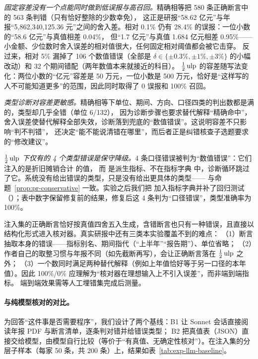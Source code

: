 \emph{固定容差没有一个点能同时做到低误报与高召回。}精确相等把 580 条正确断言中的 563 条判错（只有恰好整除的少数幸免），
这正是研报“58.62 亿元”与年报“5,862,340,125.36 元”之间的舍入差。相对 0.1\% 仍有 28.4\% 的误报：一位小数的“58.6 亿元”与真值相差 0.04\%，
但“1.7 亿元”与真值 1.684 亿元相差 0.95\%——小金额、少位数时舍入误差的相对值很大，任何固定相对阈值都会被它击穿。
反过来，相对 5\% 漏掉了 106 个数值错误（全部是 $\delta\in\{\pm0.3\%,\pm1\%,\pm3\%\}$ 的小幅改动）和 32 个期间错配（两年数值本来就接近的科目）。
$\tfrac12\operatorname{ulp}$ 的容差随写法变化：两位小数的“亿元”容差是 50 万元，一位小数是 500 万元，恰好是“这样写的人不可能知道更多”的范围，因此同时取得了 0 误报和 100\% 召回。

\emph{类型诊断对容差更敏感。}精确相等下单位、期间、方向、口径四类的判出数都是满的，类型却几乎全错（单位 6/132），
因为诊断步骤也要求替代解释“精确命中”，舍入误差使替代解释全部失效，诊断落到兜底的“数值错误”。这说明容差不只影响“判不判错”，
还决定“能不能说清错在哪里”，而后者正是纠错核查子选题要求的“修改建议”。

\emph{$\tfrac12\operatorname{ulp}$ 下仅有的 4 个类型错误是保守降级。}4 条口径错误被判为“数值错误”：它们注入的是折旧摊销合计  的值，
而  是派生指标、不在指标字典  中，诊断循环跳过了它。系统没有给出错误的类型，只是没有给出更具体的类型——
与命题~\ref{prop:pr-conservative} 一致。实验之后我们把  加入指标字典并补了回归测试（）；表中数字保留修复前的结果，修复后这 4 条判为“口径错误”，类型准确率为 100\%。

\begin{failcase}[：注入集高估了真实效果]
注入集的正确断言恰好按真值四舍五入生成，含错断言也只有一种错误，且直接以结构化形式进入核对器。真实研报中还有三类本实验覆盖不到的难点：
（1）断言抽取本身的错误——指标别名、期间指代（“上半年”“报告期”）、单位省略；
（2）作者自己的取整习惯与年报不同（如先截断再写），会让正确断言落在 $\tfrac12\operatorname{ulp}$ 之外；
（3）一个数同时满足两种替代解释（例如上年值恰好等于另一口径的本年值）。因此 100\%/0\% 应理解为“核对器在理想输入上不引入误差”，而非端到端指标。
端到端效果需等人工埋错集完成后测量。
\end{failcase}

\paragraph{与纯模型核对的对比。}为回答“这件事是否需要程序”，我们设计了两个基线：B1 让 Sonnet 会话直接阅读年报 PDF 与断言清单，逐条判对错并给错误类型；
B2 把真值表（JSON）直接交给模型，由模型自行比较（等价于“有真值、无确定性核对”）。在注入集的分层子样本（每家 50 条，共 200 条）上，结果如表~\ref{tab:exp-llm-baseline}。

